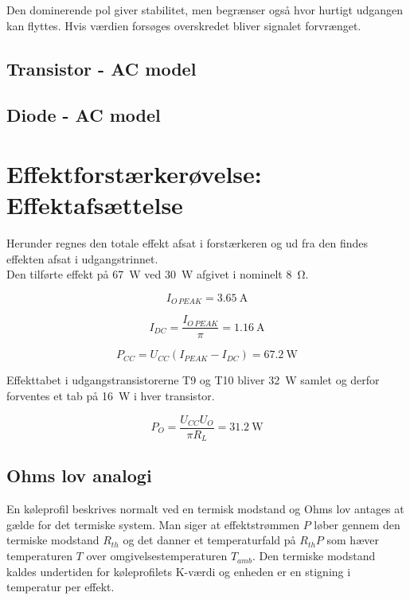 \documentclass[danish]{article}
\begin{document}
Den dominerende pol giver stabilitet, men begrænser også hvor hurtigt udgangen kan flyttes. Hvis værdien forsøges overskredet bliver signalet forvrænget.

\subsection{Transistor - AC model}
\subsection{Diode - AC model}

\newpage
\section{Effektforstærkerøvelse: Effektafsættelse}
Herunder regnes den totale effekt afsat i forstærkeren og ud fra den findes effekten afsat i udgangstrinnet.\\

Den tilførte effekt på \SI{67}{\watt} ved \SI{30}{\watt} afgivet i nominelt \SI{8}{\ohm}. 

\begin{equation}
I_{O\,PEAK} = \SI{3.65}{\ampere}
\end{equation}

\begin{equation}
I_{DC} = \dfrac{I_{O\,PEAK}}{\pi} =\SI{1.16}{\ampere}
\end{equation}

\begin{equation}
P_{CC} = U_{CC}(I_{PEAK}-I_{DC})=\SI{67.2}{\watt}
\end{equation}

Effekttabet i udgangstransistorerne T9 og T10 bliver \SI{32}{\watt} samlet og derfor forventes et tab på \SI{16}{\watt} i hver transistor. 

\begin{equation}
P_O = \dfrac{U_{CC}U_O}{\pi R_L} =\SI{31.2}{\watt}
\end{equation}

\subsection{Ohms lov analogi}
En køleprofil beskrives normalt ved en termisk modstand og Ohms lov antages at gælde for det termiske system. 
Man siger at effektstrømmen $P$ løber gennem den termiske modstand $R_{th}$ og det danner et temperaturfald på $R_{th}P$ som hæver temperaturen $T$ over omgivelsestemperaturen $T_{amb}$.
Den termiske modstand kaldes undertiden for køleprofilets K-værdi og enheden er en stigning i temperatur per effekt.
\end{document}
